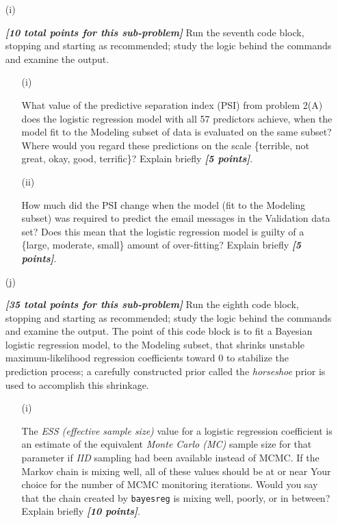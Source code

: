 \documentclass[12pt]{article}
\newcommand{\bi}[1]{\textbf{\textit{#1}}}
\begin{document}
\begin{itemize}
\item[(i)]

\bi{[10 total points for this sub-problem]} Run the seventh code block, stopping and starting as recommended; study the logic behind the commands and examine the output. 

\begin{itemize}

\item[(i)]

What value of the predictive separation index (PSI) from problem 2(A) does the logistic regression model with all 57 predictors achieve, when the model fit to the \textsf{Modeling} subset of data is evaluated on the same subset? Where would you regard these predictions on the scale \{terrible, not great, okay, good, terrific\}? Explain briefly \bi{[5 points]}. 

\item[(ii)]

How much did the PSI change when the model (fit to the \textsf{Modeling} subset) was required to predict the email messages in the \textsf{Validation} data set? Does this mean that the logistic regression model is guilty of a \{large, moderate, small\} amount of over-fitting? Explain briefly \bi{[5 points]}.

\end{itemize}

\item[(j)]

\bi{[35 total points for this sub-problem]} Run the eighth code block, stopping and starting as recommended; study the logic behind the commands and examine the output. The point of this code block is to fit a Bayesian logistic regression model, to the \textsf{Modeling} subset, that shrinks unstable maximum-likelihood regression coefficients toward 0 to stabilize the prediction process; a carefully constructed prior called the \textit{horseshoe} prior is used to accomplish this shrinkage.

\begin{itemize}

\item[(i)]

The \textit{ESS (effective sample size)} value for a logistic regression coefficient is an estimate of the equivalent \textit{Monte Carlo (MC)} sample size for that parameter if \textit{IID} sampling had been available instead of MCMC. If the Markov chain is mixing well, all of these values should be at or near Your choice for the number of MCMC monitoring iterations. Would you say that the chain created by \texttt{bayesreg} is mixing well, poorly, or in between? Explain briefly \bi{[10 points]}.


\end{itemize}
\end{itemize}
\end{document}
